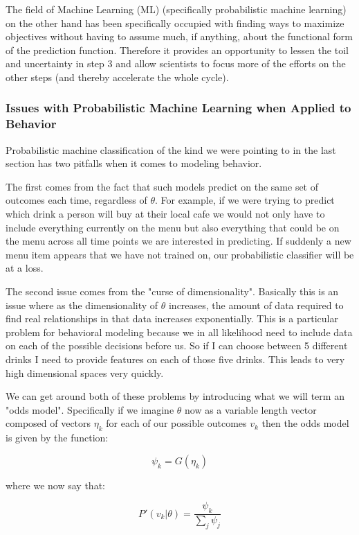 \documentclass[11pt]{article}
\begin{document}
The field of Machine Learning (ML) (specifically probabilistic machine learning) on the other hand has been specifically occupied with finding ways to maximize objectives without having to assume much, if anything, about the functional form of the prediction function. Therefore it provides an opportunity to lessen the toil and uncertainty in step 3 and allow scientists to focus more of the efforts on the other steps (and thereby accelerate the whole cycle).

\subsubsection{Issues with Probabilistic Machine Learning when Applied to Behavior}

Probabilistic machine classification of the kind we were pointing to in the last section has two pitfalls when it comes to modeling behavior. 

The first comes from the fact that such models predict on the same set of outcomes each time, regardless of $\theta$. For example, if we were trying to predict which drink a person will buy at their local cafe we would not only have to include everything currently on the menu but also everything that could be on the menu across all time points we are interested in predicting. If suddenly a new menu item appears that we have not trained on, our probabilistic classifier will be at a loss. 

The second issue comes from the "curse of dimensionality". Basically this is an issue where as the dimensionality of $\theta$ increases, the amount of data required to find real relationships in that data increases exponentially. This is a particular problem for behavioral modeling because we in all likelihood need to include data on each of the possible decisions before us. So if I can choose between 5 different drinks I need to provide features on each of those five drinks. This leads to very high dimensional spaces very quickly. \newline


We can get around both of these problems by introducing what we will term an "odds model". Specifically if we imagine $\theta$ now as a variable length vector composed of vectors $\eta_k$ for each of our possible outcomes $v_k$ then the odds model is given by the function:

$$\psi_k=G(\eta_k)$$

where we now say that:

$$P'(v_k|\theta) = \frac{\psi_k}{\sum_j \psi_j}$$
\end{document}
